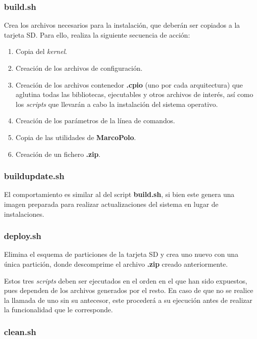 \documentclass{article}
\begin{document}
\subsubsection*{build.sh}

Crea los archivos necesarios para la instalación, que deberán ser copiados a la tarjeta SD. Para ello, realiza la siguiente secuencia de acción:

\begin{enumerate}
\item Copia del \textit{kernel}.
\item Creación de los archivos de configuración.
\item Creación de los archivos contenedor \textbf{.cpio} (uno por cada arquitectura) que aglutina todas las bibliotecas, ejecutables y otros archivos de interés, así como los \textit{scripts} que llevarán a cabo la instalación del sistema operativo. 
\item Creación de los parámetros de la línea de comandos.
\item Copia de las utilidades de \textbf{MarcoPolo}.
\item Creación de un fichero \textbf{.zip}.
\end{enumerate}

\subsubsection*{buildupdate.sh}

El comportamiento es similar al del script \textbf{build.sh}, si bien este genera una imagen preparada para realizar actualizaciones del sistema en lugar de instalaciones.

\subsubsection*{deploy.sh}

Elimina el esquema de particiones de la tarjeta SD y crea uno nuevo con una única partición, donde descomprime el archivo \textbf{.zip} creado anteriormente.

Estos tres \textit{scripts} deben ser ejecutados en el orden en el que han sido expuestos, pues dependen de los archivos generados por el resto. En caso de que no se realice la llamada de uno sin su antecesor, este procederá a su ejecución antes de realizar la funcionalidad que le corresponde.

\subsubsection*{clean.sh}
\end{document}
